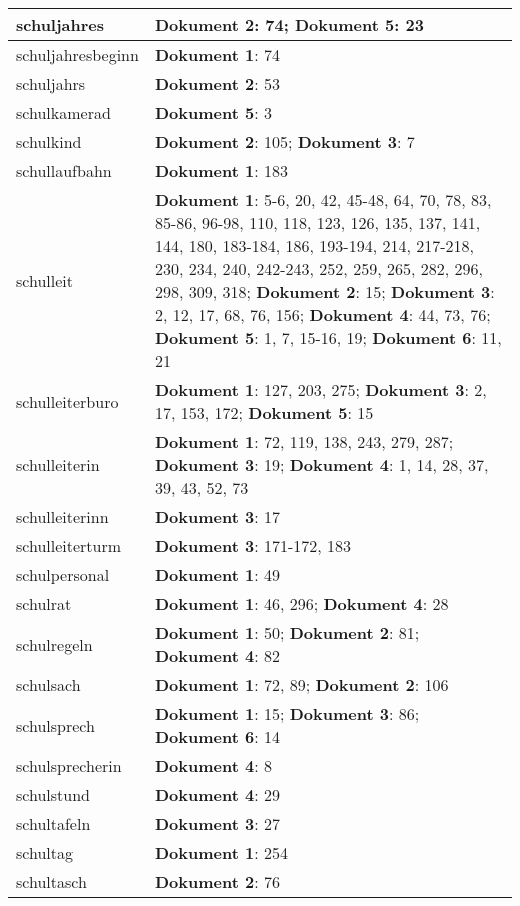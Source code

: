 \documentclass[a5paper]{article}
\begin{document}
\begin{longtable}[l]{|l|p{3in}|}
\hline
schuljahres & \textbf{Dokument 2}: 74; \textbf{Dokument 5}: 23 \\
\hline
schuljahresbeginn & \textbf{Dokument 1}: 74 \\
\hline
schuljahrs & \textbf{Dokument 2}: 53 \\
\hline
schulkamerad & \textbf{Dokument 5}: 3 \\
\hline
schulkind & \textbf{Dokument 2}: 105; \textbf{Dokument 3}: 7 \\
\hline
schullaufbahn & \textbf{Dokument 1}: 183 \\
\hline
schulleit & \textbf{Dokument 1}: 5-6, 20, 42, 45-48, 64, 70, 78, 83, 85-86, 96-98, 110, 118, 123, 126, 135, 137, 141, 144, 180, 183-184, 186, 193-194, 214, 217-218, 230, 234, 240, 242-243, 252, 259, 265, 282, 296, 298, 309, 318; \textbf{Dokument 2}: 15; \textbf{Dokument 3}: 2, 12, 17, 68, 76, 156; \textbf{Dokument 4}: 44, 73, 76; \textbf{Dokument 5}: 1, 7, 15-16, 19; \textbf{Dokument 6}: 11, 21 \\
\hline
schulleiterburo & \textbf{Dokument 1}: 127, 203, 275; \textbf{Dokument 3}: 2, 17, 153, 172; \textbf{Dokument 5}: 15 \\
\hline
schulleiterin & \textbf{Dokument 1}: 72, 119, 138, 243, 279, 287; \textbf{Dokument 3}: 19; \textbf{Dokument 4}: 1, 14, 28, 37, 39, 43, 52, 73 \\
\hline
schulleiterinn & \textbf{Dokument 3}: 17 \\
\hline
schulleiterturm & \textbf{Dokument 3}: 171-172, 183 \\
\hline
schulpersonal & \textbf{Dokument 1}: 49 \\
\hline
schulrat & \textbf{Dokument 1}: 46, 296; \textbf{Dokument 4}: 28 \\
\hline
schulregeln & \textbf{Dokument 1}: 50; \textbf{Dokument 2}: 81; \textbf{Dokument 4}: 82 \\
\hline
schulsach & \textbf{Dokument 1}: 72, 89; \textbf{Dokument 2}: 106 \\
\hline
schulsprech & \textbf{Dokument 1}: 15; \textbf{Dokument 3}: 86; \textbf{Dokument 6}: 14 \\
\hline
schulsprecherin & \textbf{Dokument 4}: 8 \\
\hline
schulstund & \textbf{Dokument 4}: 29 \\
\hline
schultafeln & \textbf{Dokument 3}: 27 \\
\hline
schultag & \textbf{Dokument 1}: 254 \\
\hline
schultasch & \textbf{Dokument 2}: 76 \\

\end{longtable}
\end{document}
